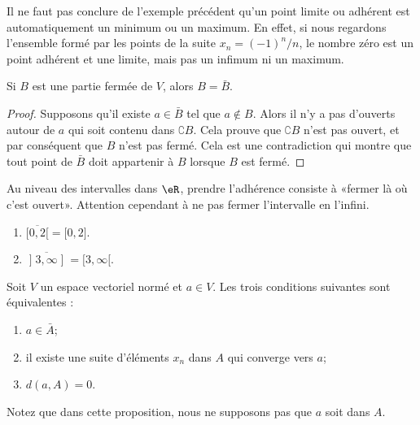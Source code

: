 \begin{example}		\label{ParlerEncoredeF}
	Il ne faut pas conclure de l'exemple précédent qu'un point limite ou adhérent est automatiquement un minimum ou un maximum. En effet, si nous regardons l'ensemble formé par les points de la suite \( x_n=(-1)^n/n\), le nombre zéro est un point adhérent et une limite, mais pas un infimum ni un maximum.
\end{example}

\begin{lemma}
	Si \( B\) est une partie fermée de \( V\), alors \( B=\bar B\).
\end{lemma}

\begin{proof}
	Supposons qu'il existe \( a\in\bar B\) tel que \( a\notin B\). Alors il n'y a pas d'ouverts autour de \( a\) qui soit contenu dans \( \complement B\). Cela prouve que \( \complement B\) n'est pas ouvert, et par conséquent que \( B\) n'est pas fermé. Cela est une contradiction qui montre que tout point de \( \bar B\) doit appartenir à \( B\) lorsque \( B\) est fermé.
\end{proof}

\begin{example}
	Au niveau des intervalles dans \( \eR\), prendre l'adhérence consiste à «fermer là où c'est ouvert». Attention cependant à ne pas fermer l'intervalle en l'infini.
	\begin{enumerate}
		\item
		      \( \overline{ \mathopen[ 0 , 2 [ }=\mathopen[ 0 , 2 \mathclose]\).
		\item
		      \( \overline{ \mathopen] 3 , \infty \mathopen] }=\mathopen[ 3 , \infty [\).
	\end{enumerate}
\end{example}

\begin{proposition}
	Soit \( V\) un espace vectoriel normé et \( a\in V\). Les trois conditions suivantes sont équivalentes :
	\begin{enumerate}
		\item
		      \( a\in\bar A\);
		\item
		      il existe une suite d'éléments \( x_n\) dans \( A\) qui converge vers \( a\);
		\item
		      \( d(a,A)=0\).
	\end{enumerate}
\end{proposition}
Notez que dans cette proposition, nous ne supposons pas que \( a\) soit dans \( A\).

